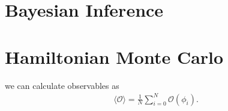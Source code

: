 \documentclass[11pt]{article}
\begin{document}
    \section{Bayesian Inference}\label{sec:bayesian_inference}



    \section{Hamiltonian Monte Carlo}\label{sec:hamiltonian_monte_carlo}

    we can calculate observables as
    \begin{equation}\label{eq:field_observable}
    \begin{aligned}
        \langle \mathcal{O} \rangle = \frac{1}{N}\sum_{i=0}^N \mathcal{O}(\phi_i).
    \end{aligned}
    \end{equation}
\end{document}
